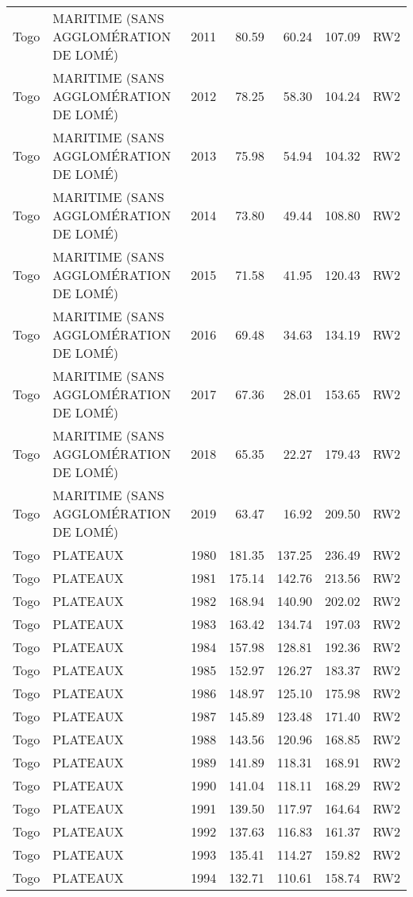 \begin{longtable}{lllrrrl}
  Togo & MARITIME (SANS AGGLOMÉRATION DE LOMÉ) & 2011 & 80.59 & 60.24 & 107.09 & RW2 \\ 
  Togo & MARITIME (SANS AGGLOMÉRATION DE LOMÉ) & 2012 & 78.25 & 58.30 & 104.24 & RW2 \\ 
  Togo & MARITIME (SANS AGGLOMÉRATION DE LOMÉ) & 2013 & 75.98 & 54.94 & 104.32 & RW2 \\ 
  Togo & MARITIME (SANS AGGLOMÉRATION DE LOMÉ) & 2014 & 73.80 & 49.44 & 108.80 & RW2 \\ 
  Togo & MARITIME (SANS AGGLOMÉRATION DE LOMÉ) & 2015 & 71.58 & 41.95 & 120.43 & RW2 \\ 
  Togo & MARITIME (SANS AGGLOMÉRATION DE LOMÉ) & 2016 & 69.48 & 34.63 & 134.19 & RW2 \\ 
  Togo & MARITIME (SANS AGGLOMÉRATION DE LOMÉ) & 2017 & 67.36 & 28.01 & 153.65 & RW2 \\ 
  Togo & MARITIME (SANS AGGLOMÉRATION DE LOMÉ) & 2018 & 65.35 & 22.27 & 179.43 & RW2 \\ 
  Togo & MARITIME (SANS AGGLOMÉRATION DE LOMÉ) & 2019 & 63.47 & 16.92 & 209.50 & RW2 \\ 
  Togo & PLATEAUX & 1980 & 181.35 & 137.25 & 236.49 & RW2 \\ 
  Togo & PLATEAUX & 1981 & 175.14 & 142.76 & 213.56 & RW2 \\ 
  Togo & PLATEAUX & 1982 & 168.94 & 140.90 & 202.02 & RW2 \\ 
  Togo & PLATEAUX & 1983 & 163.42 & 134.74 & 197.03 & RW2 \\ 
  Togo & PLATEAUX & 1984 & 157.98 & 128.81 & 192.36 & RW2 \\ 
  Togo & PLATEAUX & 1985 & 152.97 & 126.27 & 183.37 & RW2 \\ 
  Togo & PLATEAUX & 1986 & 148.97 & 125.10 & 175.98 & RW2 \\ 
  Togo & PLATEAUX & 1987 & 145.89 & 123.48 & 171.40 & RW2 \\ 
  Togo & PLATEAUX & 1988 & 143.56 & 120.96 & 168.85 & RW2 \\ 
  Togo & PLATEAUX & 1989 & 141.89 & 118.31 & 168.91 & RW2 \\ 
  Togo & PLATEAUX & 1990 & 141.04 & 118.11 & 168.29 & RW2 \\ 
  Togo & PLATEAUX & 1991 & 139.50 & 117.97 & 164.64 & RW2 \\ 
  Togo & PLATEAUX & 1992 & 137.63 & 116.83 & 161.37 & RW2 \\ 
  Togo & PLATEAUX & 1993 & 135.41 & 114.27 & 159.82 & RW2 \\ 
  Togo & PLATEAUX & 1994 & 132.71 & 110.61 & 158.74 & RW2 \\ 

\end{longtable}

